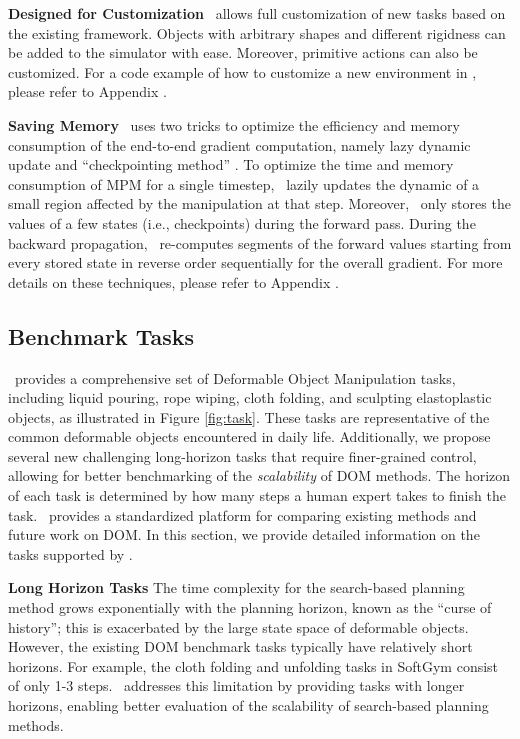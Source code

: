 \textbf{Designed for Customization} \simulator\ allows full customization of new tasks based on the existing framework. Objects with arbitrary shapes and different rigidness can be added to the simulator with ease. Moreover, primitive actions can also be customized. For a code example of how to customize a new environment in \simulator, please refer to Appendix .

\textbf{Saving Memory} \simulator\ uses two tricks to optimize the efficiency and memory consumption of the end-to-end gradient computation, namely lazy dynamic update and ``checkpointing method'' \citep{checkpoint, chen_checkpoint, Griewank_checkpoint}. To optimize the time and memory consumption of MPM for a single timestep, \simulator\ lazily updates the dynamic of a small region affected by the manipulation at that step. Moreover, \simulator\ only stores the values of a few states (i.e., checkpoints) during the forward pass. During the backward propagation, \simulator\ re-computes segments of the forward values starting from every stored state in reverse order sequentially for the overall gradient. For more details on these techniques, please refer to Appendix .

\subsection{Benchmark Tasks}
\algo\ provides a comprehensive set of Deformable Object Manipulation tasks, including liquid pouring, rope wiping, cloth folding, and sculpting elastoplastic objects, as illustrated in Figure \ref{fig:task}. These tasks are representative of the common deformable objects encountered in daily life.
Additionally, we propose several new challenging long-horizon tasks that require finer-grained control, allowing for better benchmarking of the \emph{scalability} of DOM methods. The horizon of each task is determined by how many steps a human expert takes to finish the task. \algo\ provides a standardized platform for comparing existing methods and future work on DOM. In this section, we provide detailed information on the tasks supported by \algo.

\textbf{Long Horizon Tasks}
The time complexity for the search-based planning method grows exponentially with the planning horizon, known as the ``curse of history''; this is exacerbated by the large state space of deformable objects.
 However, the existing DOM benchmark tasks typically have relatively short horizons. For example, the cloth folding and unfolding tasks in SoftGym consist of only 1-3 steps. \algo\ addresses this limitation by providing tasks with longer horizons, enabling better evaluation of the scalability of search-based planning methods.

